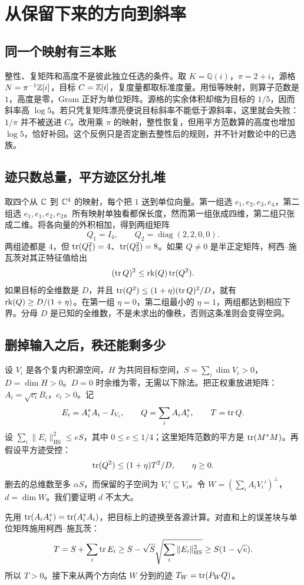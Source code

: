 \section{从保留下来的方向到斜率}
\subsection{同一个映射有三本账}
整性、复矩阵和高度不是彼此独立任选的条件。取 $K=\mathbb Q(i)$，$\pi=2+i$，源格 $N=\pi^{-1}\mathbb Z[i]$，目标 $C=\mathbb Z[i]$，复度量都取标准度量。用恒等映射，则算子范数是 $1$，高度是零，Gram 正好为单位矩阵。源格的实余体积却缩为目标的 $1/5$，因而斜率高 $\log5$。若只凭复矩阵漂亮便说目标斜率不能低于源斜率，这里就会失败：$1/\pi$ 并不被送进 $C$。改用乘 $\pi$ 的映射，整性恢复，但用平方范数算的高度也增加 $\log5$，恰好补回。这个反例只是否定删去整性后的规则，并不针对数论中的已选族。

\subsection{迹只数总量，平方迹区分扎堆}
取四个从 $\mathbb C$ 到 $\mathbb C^4$ 的映射，每个把 $1$ 送到单位向量。第一组选 $e_1,e_2,e_3,e_4$，第二组选 $e_1,e_1,e_2,e_2$。所有映射单独看都保长度，然而第一组张成四维，第二组只张成二维。将各向量的外积相加，得到两组矩阵
\[
 Q_1=I_4,\qquad Q_2=\operatorname{diag}(2,2,0,0).
\]
两组迹都是 $4$，但 $\operatorname{tr}(Q_1^2)=4$、$\operatorname{tr}(Q_2^2)=8$。如果 $Q\ne0$ 是半正定矩阵，柯西–施瓦茨对其正特征值给出
\[
                  (\operatorname{tr} Q)^2\le \operatorname{rk}(Q)\operatorname{tr}(Q^2).
\]
如果目标的全维数是 $D$，并且 $\operatorname{tr}(Q^2)\le (1+\eta)(\operatorname{tr} Q)^2/D$，就有 $\operatorname{rk}(Q)\ge D/(1+\eta)$。在第一组 $\eta=0$，第二组最小的 $\eta=1$，两组都达到相应下界。分母 $D$ 是已知的全维数，不是未求出的像秩，否则这条准则会变得空洞。

\subsection{删掉输入之后，秩还能剩多少}
设 $V_i$ 是各个复内积源空间，$H$ 为共同目标空间，$S=\sum_i\dim V_i>0$，$D=\dim H>0$。$D=0$ 时余维为零，无需以下除法。把正权重放进矩阵：$A_i=\sqrt{c_i}B_i$，$c_i>0$。记
\[
 E_i=A_i^*A_i-I_{V_i},\qquad Q=\sum_i A_i A_i^*,
 \qquad T=\operatorname{tr} Q.
\]
设 $\sum_i\|E_i\|^2_{\mathrm{HS}}\le eS$，其中 $0\le e\le 1/4$；这里矩阵范数的平方是 $\operatorname{tr}(M^*M)$。再假设平方迹受控：\[\operatorname{tr}(Q^2)\le(1+\eta)T^2/D,\qquad \eta\ge0.\]删去的总维数至多 $\alpha S$，而保留的子空间为 $V_i'\subseteq V_i$。令 $W=(\sum_iA_iV_i')^\perp$，$d=\dim W$。我们要证明 $d$ 不太大。

先用 $\operatorname{tr}(A_iA_i^*)=\operatorname{tr}(A_i^*A_i)$，把目标上的迹换至各源计算。对直和上的误差块与单位矩阵施用柯西–施瓦茨：
\[
 T=S+\sum_i\operatorname{tr} E_i
 \ge S-\sqrt S\sqrt{\sum_i\|E_i\|^2_{\mathrm{HS}}}
 \ge S(1-\sqrt e).
\]
所以 $T>0$。接下来从两个方向估 $W$ 分到的迹 $T_W=\operatorname{tr}(P_WQ)$。

